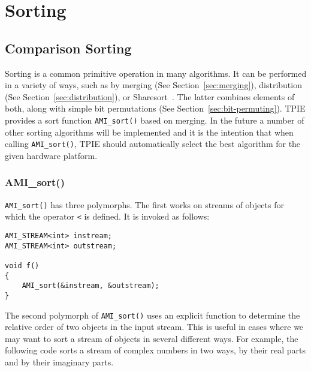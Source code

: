 \section{Sorting}

\subsection{Comparison Sorting} \label{sec:cmp-sorting}

Sorting is a common primitive operation in many algorithms.  It can be
performed in a variety of ways, such as by merging (See
Section~\ref{sec:merging}), distribution (See
Section~\ref{sec:distribution}), or Sharesort~\cite{aggarwal:optimal}. The
latter combines elements of both, along with simple bit permutations
(See Section~\ref{sec:bit-permuting}). TPIE provides a sort function
\verb|AMI_sort()| based on merging. In the future a number of other sorting
algorithms will be implemented and it is the intention that when
calling \verb|AMI_sort()|, TPIE should automatically select the best
algorithm for the given hardware platform.


\subsubsection{AMI\_sort()}
\verb|AMI_sort()| has three polymorphs. The first works on streams of
objects for which the operator \verb|<| is defined. It is invoked as
follows:

\begin{verbatim}
AMI_STREAM<int> instream;
AMI_STREAM<int> outstream;

void f()
{
    AMI_sort(&instream, &outstream);
}
\end{verbatim}

The second polymorph of \verb|AMI_sort()| uses an explicit function to
determine the relative order of two objects in the input stream.  This
is useful in cases where we may want to sort a stream of objects in
several different ways.  For example, the following code sorts a
stream of complex numbers in two ways, by their real parts and by
their imaginary parts.

